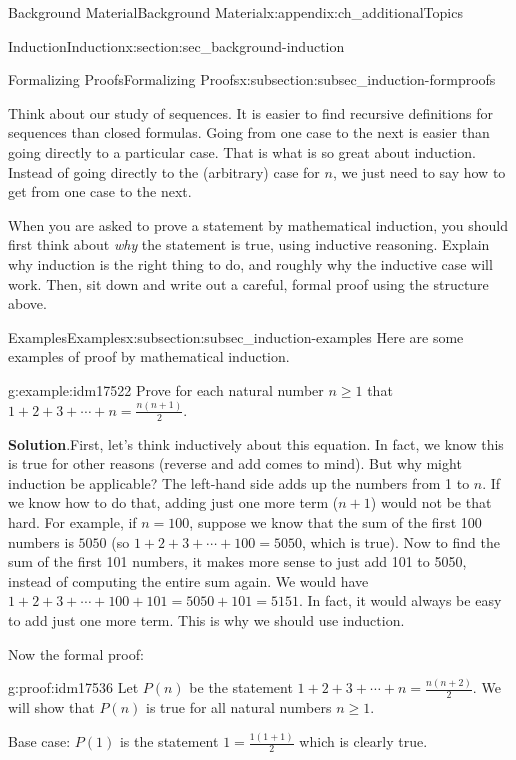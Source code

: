 \documentclass[oneside,10pt,]{book}
\numberwithin{equation}{chapter}
\begin{document}
\begin{appendixptx}{Background Material}{}{Background Material}{}{}{x:appendix:ch_additionalTopics}
\begin{sectionptx}{Induction}{}{Induction}{}{}{x:section:sec_background-induction}
\begin{subsectionptx}{Formalizing Proofs}{}{Formalizing Proofs}{}{}{x:subsection:subsec_induction-formproofs}
\par
Think about our study of sequences. It is easier to find recursive definitions for sequences than closed formulas. Going from one case to the next is easier than going directly to a particular case. That is what is so great about induction. Instead of going directly to the (arbitrary) case for \(n\), we just need to say how to get from one case to the next.%
\par
When you are asked to prove a statement by mathematical induction, you should first think about \emph{why} the statement is true, using inductive reasoning. Explain why induction is the right thing to do, and roughly why the inductive case will work. Then, sit down and write out a careful, formal proof using the structure above.%
\end{subsectionptx}
%
%
\typeout{************************************************}
\typeout{************************************************}
%
\begin{subsectionptx}{Examples}{}{Examples}{}{}{x:subsection:subsec_induction-examples}
Here are some examples of proof by mathematical induction.%
\begin{example}{}{g:example:idm17522}%
Prove for each natural number \(n \ge 1\) that \(1 + 2 + 3 + \cdots + n = \frac{n(n+1)}{2}\).%
\par\smallskip%
\noindent\textbf{Solution}.\hypertarget{g:solution:idm17527}{}\quad{}First, let's think inductively about this equation. In fact, we know this is true for other reasons (reverse and add comes to mind). But why might induction be applicable? The left-hand side adds up the numbers from 1 to \(n\). If we know how to do that, adding just one more term (\(n+1\)) would not be that hard. For example, if \(n = 100\), suppose we know that the sum of the first 100 numbers is \(5050\) (so \(1 + 2 + 3 + \cdots + 100 = 5050\), which is true). Now to find the sum of the first 101 numbers, it makes more sense to just add 101 to 5050, instead of computing the entire sum again. We would have \(1 + 2 + 3 + \cdots + 100 + 101 = 5050 + 101 = 5151\). In fact, it would always be easy to add just one more term. This is why we should use induction.%
\par
Now the formal proof:%
\begin{proofptx}{}{g:proof:idm17536}
Let \(P(n)\) be the statement \(1 + 2 + 3 + \cdots + n = \frac{n(n+2)}{2}\). We will show that \(P(n)\) is true for all natural numbers \(n \ge 1\).%
\par
Base case: \(P(1)\) is the statement \(1 = \frac{1(1+1)}{2}\) which is clearly true.%

\end{proofptx}
\end{example}
\end{subsectionptx}
\end{sectionptx}
\end{appendixptx}
\end{document}
